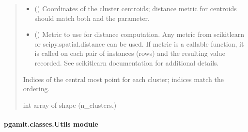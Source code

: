 \documentclass[letterpaper,10pt,english]{sphinxmanual}
\begin{document}
\begin{fulllineitems}
\begin{quote}
\begin{description}
\begin{itemize}
\item {} 
\sphinxAtStartPar
{} (\sphinxstyleliteralemphasis{\sphinxupquote{ (}}\sphinxstyleliteralemphasis{\sphinxupquote{, }}\sphinxstyleliteralemphasis{\sphinxupquote{)}}) \textendash{} Coordinates of the cluster centroids; distance metric for centroids
should match both  and the  parameter.

\item {} 
\sphinxAtStartPar
{} (\sphinxstyleliteralemphasis{\sphinxupquote{, }}) \textendash{} Metric to use for distance computation. Any metric from scikit\sphinxhyphen{}learn or
scipy.spatial.distance can be used. If metric is a callable function,
it is called on each pair of instances (rows) and the resulting value
recorded. See scikit\sphinxhyphen{}learn documentation for additional details.

\end{itemize}

\sphinxAtStartPar
{} \textendash{} Indices of the central most point for each cluster; indices match the
 ordering.

\sphinxAtStartPar
int array of shape (n\_clusters,)

\end{description}\end{quote}

\end{fulllineitems}



\paragraph{pgamit.classes.Utils module}
\label{\detokenize{pgamit.classes:module-pgamit.classes.Utils}}\label{\detokenize{pgamit.classes:pgamit-classes-utils-module}}
\end{document}
